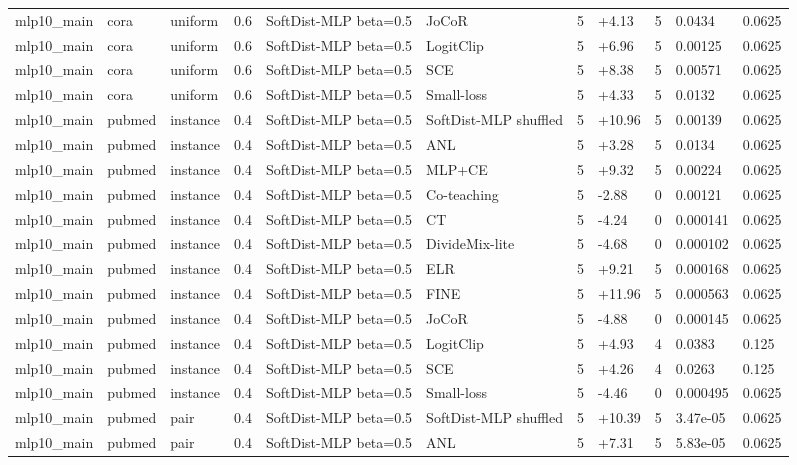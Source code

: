 \begin{table}[t]
\begin{tabular}{llllllrlrll}
mlp10_main & cora & uniform & 0.6 & SoftDist-MLP beta=0.5 & JoCoR & 5 & +4.13 & 5 & 0.0434 & 0.0625 \\
mlp10_main & cora & uniform & 0.6 & SoftDist-MLP beta=0.5 & LogitClip & 5 & +6.96 & 5 & 0.00125 & 0.0625 \\
mlp10_main & cora & uniform & 0.6 & SoftDist-MLP beta=0.5 & SCE & 5 & +8.38 & 5 & 0.00571 & 0.0625 \\
mlp10_main & cora & uniform & 0.6 & SoftDist-MLP beta=0.5 & Small-loss & 5 & +4.33 & 5 & 0.0132 & 0.0625 \\
mlp10_main & pubmed & instance & 0.4 & SoftDist-MLP beta=0.5 & SoftDist-MLP shuffled & 5 & +10.96 & 5 & 0.00139 & 0.0625 \\
mlp10_main & pubmed & instance & 0.4 & SoftDist-MLP beta=0.5 & ANL & 5 & +3.28 & 5 & 0.0134 & 0.0625 \\
mlp10_main & pubmed & instance & 0.4 & SoftDist-MLP beta=0.5 & MLP+CE & 5 & +9.32 & 5 & 0.00224 & 0.0625 \\
mlp10_main & pubmed & instance & 0.4 & SoftDist-MLP beta=0.5 & Co-teaching & 5 & -2.88 & 0 & 0.00121 & 0.0625 \\
mlp10_main & pubmed & instance & 0.4 & SoftDist-MLP beta=0.5 & CT & 5 & -4.24 & 0 & 0.000141 & 0.0625 \\
mlp10_main & pubmed & instance & 0.4 & SoftDist-MLP beta=0.5 & DivideMix-lite & 5 & -4.68 & 0 & 0.000102 & 0.0625 \\
mlp10_main & pubmed & instance & 0.4 & SoftDist-MLP beta=0.5 & ELR & 5 & +9.21 & 5 & 0.000168 & 0.0625 \\
mlp10_main & pubmed & instance & 0.4 & SoftDist-MLP beta=0.5 & FINE & 5 & +11.96 & 5 & 0.000563 & 0.0625 \\
mlp10_main & pubmed & instance & 0.4 & SoftDist-MLP beta=0.5 & JoCoR & 5 & -4.88 & 0 & 0.000145 & 0.0625 \\
mlp10_main & pubmed & instance & 0.4 & SoftDist-MLP beta=0.5 & LogitClip & 5 & +4.93 & 4 & 0.0383 & 0.125 \\
mlp10_main & pubmed & instance & 0.4 & SoftDist-MLP beta=0.5 & SCE & 5 & +4.26 & 4 & 0.0263 & 0.125 \\
mlp10_main & pubmed & instance & 0.4 & SoftDist-MLP beta=0.5 & Small-loss & 5 & -4.46 & 0 & 0.000495 & 0.0625 \\
mlp10_main & pubmed & pair & 0.4 & SoftDist-MLP beta=0.5 & SoftDist-MLP shuffled & 5 & +10.39 & 5 & 3.47e-05 & 0.0625 \\
mlp10_main & pubmed & pair & 0.4 & SoftDist-MLP beta=0.5 & ANL & 5 & +7.31 & 5 & 5.83e-05 & 0.0625 \\

\end{tabular}
\end{table}
